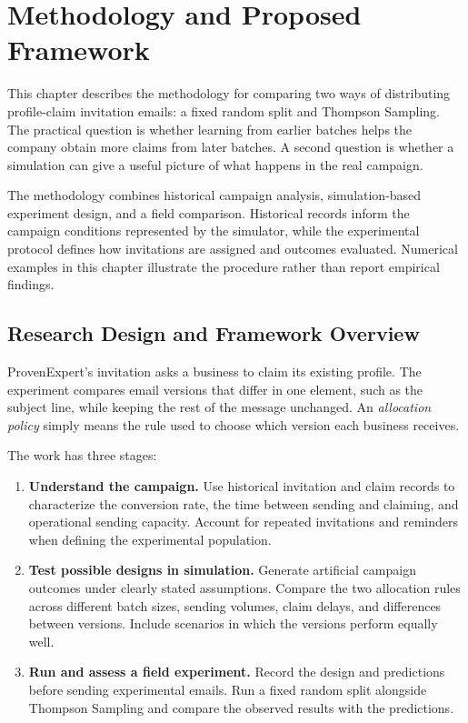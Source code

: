 \chapter{Methodology and Proposed Framework}
\label{chap:methodology}

This chapter describes the methodology for comparing two ways of distributing profile-claim invitation emails: a fixed random split and Thompson Sampling. The practical question is whether learning from earlier batches helps the company obtain more claims from later batches. A second question is whether a simulation can give a useful picture of what happens in the real campaign.

The methodology combines historical campaign analysis, simulation-based experiment design, and a field comparison. Historical records inform the campaign conditions represented by the simulator, while the experimental protocol defines how invitations are assigned and outcomes evaluated. Numerical examples in this chapter illustrate the procedure rather than report empirical findings.

\section{Research Design and Framework Overview}
\label{sec:method_research_design}

ProvenExpert's invitation asks a business to claim its existing profile. The experiment compares email versions that differ in one element, such as the subject line, while keeping the rest of the message unchanged. An \emph{allocation policy} simply means the rule used to choose which version each business receives.

The work has three stages:
\begin{enumerate}
    \item \textbf{Understand the campaign.} Use historical invitation and claim records to characterize the conversion rate, the time between sending and claiming, and operational sending capacity. Account for repeated invitations and reminders when defining the experimental population.
    \item \textbf{Test possible designs in simulation.} Generate artificial campaign outcomes under clearly stated assumptions. Compare the two allocation rules across different batch sizes, sending volumes, claim delays, and differences between versions. Include scenarios in which the versions perform equally well.
    \item \textbf{Run and assess a field experiment.} Record the design and predictions before sending experimental emails. Run a fixed random split alongside Thompson Sampling and compare the observed results with the predictions.
\end{enumerate}

